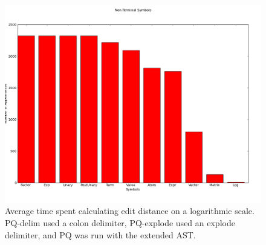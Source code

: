 \begin{figure}
    \begin{center}
        \includegraphics[scale=0.4]{figs/human/nonterm_histogram.png}
    \end{center}
        \caption{Average time spent calculating edit distance on a
                logarithmic scale. PQ-delim used a colon delimiter, PQ-explode
                used an explode delimiter, and PQ was run with the extended
                AST.}
    \label{times}
\end{figure}
















